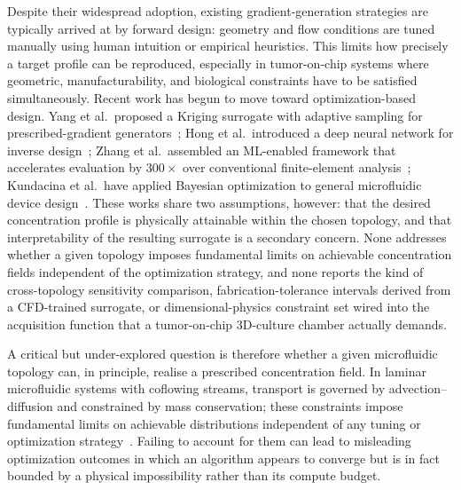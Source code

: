 \documentclass[12pt]{article}
\begin{document}
Despite their widespread adoption, existing gradient-generation strategies are typically arrived at by forward design: geometry and flow conditions are tuned manually using human intuition or empirical heuristics. This limits how precisely a target profile can be reproduced, especially in tumor-on-chip systems where geometric, manufacturability, and biological constraints have to be satisfied simultaneously. Recent work has begun to move toward optimization-based design. Yang et al.\ proposed a Kriging surrogate with adaptive sampling for prescribed-gradient generators~\cite{yang2020surrogate}; Hong et al.\ introduced a deep neural network for inverse design~\cite{hong2020inverse}; Zhang et al.\ assembled an ML-enabled framework that accelerates evaluation by $300\times$ over conventional finite-element analysis~\cite{zhang2022machine}; Kundacina et al.\ have applied Bayesian optimization to general microfluidic device design~\cite{kundacina2025advancing}. These works share two assumptions, however: that the desired concentration profile is physically attainable within the chosen topology, and that interpretability of the resulting surrogate is a secondary concern. None addresses whether a given topology imposes fundamental limits on achievable concentration fields independent of the optimization strategy, and none reports the kind of cross-topology sensitivity comparison, fabrication-tolerance intervals derived from a CFD-trained surrogate, or dimensional-physics constraint set wired into the acquisition function that a tumor-on-chip 3D-culture chamber actually demands.

A critical but under-explored question is therefore whether a given microfluidic topology can, in principle, realise a prescribed concentration field. In laminar microfluidic systems with coflowing streams, transport is governed by advection--diffusion and constrained by mass conservation; these constraints impose fundamental limits on achievable distributions independent of any tuning or optimization strategy~\cite{stone2004engineering}. Failing to account for them can lead to misleading optimization outcomes in which an algorithm appears to converge but is in fact bounded by a physical impossibility rather than its compute budget.
\end{document}
